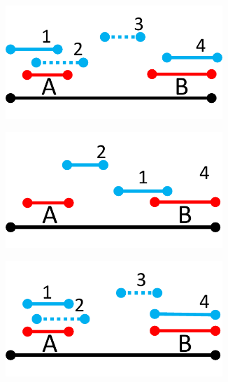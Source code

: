 \documentclass[10pt,journal,compsoc]{IEEEtran}
\begin{document}

%

\begin{figure}[t]
\centering

  \begin{subfigure}[b]{0.20\textwidth}
   	\includegraphics[width=0.9\textwidth]{figures/Matching/HMLC_example.pdf}
    \caption{\label{fig:HMLC_example}}
   \end{subfigure} 
     \begin{subfigure}[b]{0.20\textwidth}
   	\includegraphics[width=0.9\textwidth]{figures/Matching/Tied.pdf}
        \caption{\label{fig:tied}}
   \end{subfigure}
  \begin{subfigure}[b]{0.20\textwidth}
   	\includegraphics[width=0.9\textwidth]{figures/Matching/HMLC_r1.pdf}

\end{subfigure}
\end{figure}
\end{document}
